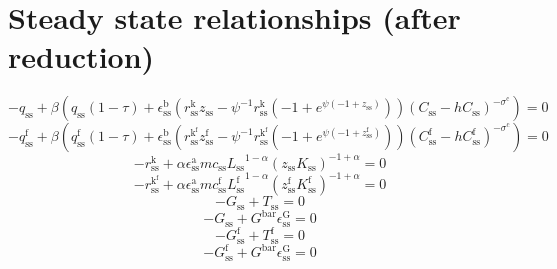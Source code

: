 \section{Steady state relationships (after reduction)}

\begin{equation}
-q_\mathrm{ss} + {\beta} \left({q_\mathrm{ss}} \left(1 - \tau\right) + {\epsilon^{\mathrm{b}}_\mathrm{ss}} \left({r^{\mathrm{k}}_\mathrm{ss}} {z_\mathrm{ss}} - {\psi}^{-1} {r^{\mathrm{k}}_\mathrm{ss}} \left(-1 + e^{{\psi} \left(-1 + z_\mathrm{ss}\right)}\right)\right) {\left(C_\mathrm{ss} - {h} {C_\mathrm{ss}}\right)^{-\sigma^{\mathrm{c}}}}\right) = 0
\end{equation}
\begin{equation}
-q^{\mathrm{f}}_\mathrm{ss} + {\beta} \left({q^{\mathrm{f}}_\mathrm{ss}} \left(1 - \tau\right) + {\epsilon^{\mathrm{b}}_\mathrm{ss}} \left({r^{\mathrm{k}^{\mathrm{f}}}_\mathrm{ss}} {z^{\mathrm{f}}_\mathrm{ss}} - {\psi}^{-1} {r^{\mathrm{k}^{\mathrm{f}}}_\mathrm{ss}} \left(-1 + e^{{\psi} \left(-1 + z^{\mathrm{f}}_\mathrm{ss}\right)}\right)\right) {\left(C^{\mathrm{f}}_\mathrm{ss} - {h} {C^{\mathrm{f}}_\mathrm{ss}}\right)^{-\sigma^{\mathrm{c}}}}\right) = 0
\end{equation}
\begin{equation}
-r^{\mathrm{k}}_\mathrm{ss} + {\alpha} {\epsilon^{\mathrm{a}}_\mathrm{ss}} {{m\!c}_\mathrm{ss}} {{L_\mathrm{ss}}^{1 - \alpha}} {\left({z_\mathrm{ss}} {K_\mathrm{ss}}\right)^{-1 + \alpha}} = 0
\end{equation}
\begin{equation}
-r^{\mathrm{k}^{\mathrm{f}}}_\mathrm{ss} + {\alpha} {\epsilon^{\mathrm{a}}_\mathrm{ss}} {{m\!c}^{\mathrm{f}}_\mathrm{ss}} {{L^{\mathrm{f}}_\mathrm{ss}}^{1 - \alpha}} {\left({z^{\mathrm{f}}_\mathrm{ss}} {K^{\mathrm{f}}_\mathrm{ss}}\right)^{-1 + \alpha}} = 0
\end{equation}
\begin{equation}
-G_\mathrm{ss} + T_\mathrm{ss} = 0
\end{equation}
\begin{equation}
-G_\mathrm{ss} + {G^{\mathrm{bar}}} {\epsilon^{\mathrm{G}}_\mathrm{ss}} = 0
\end{equation}
\begin{equation}
-G^{\mathrm{f}}_\mathrm{ss} + T^{\mathrm{f}}_\mathrm{ss} = 0
\end{equation}
\begin{equation}
-G^{\mathrm{f}}_\mathrm{ss} + {G^{\mathrm{bar}}} {\epsilon^{\mathrm{G}}_\mathrm{ss}} = 0
\end{equation}
